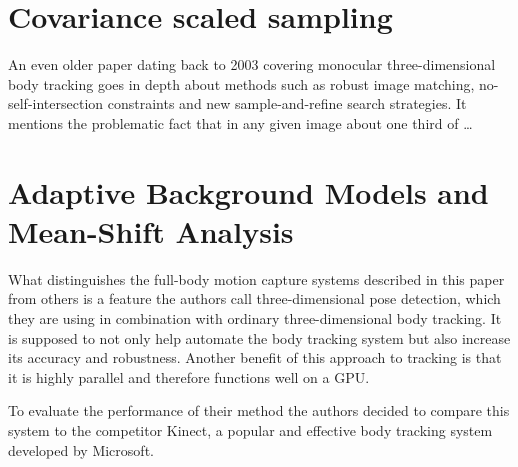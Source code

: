 \section{Covariance scaled sampling}
An even older paper dating back to 2003 covering monocular three-dimensional body tracking goes in depth about methods such as robust image matching, no-self-intersection
constraints and new sample-and-refine search strategies. It mentions the problematic fact that in any given image about one third of …

\section{Adaptive Background Models and Mean-Shift Analysis}
What distinguishes the full-body motion capture systems described in this paper from others is a feature the authors call three-dimensional pose detection, which they are using
in combination with ordinary three-dimensional body tracking. It is supposed to not only help automate the body tracking system but also increase its accuracy and robustness.
Another benefit of this approach to tracking is that it is highly parallel and therefore functions well on a GPU.

To evaluate the performance of their method the authors decided to compare this system to the competitor Kinect, a popular and effective body tracking system developed by Microsoft.